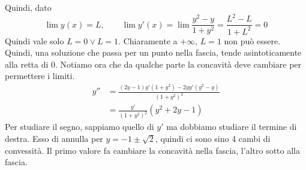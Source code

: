\documentclass[a4paper]{article}
\begin{document}
{    Quindi, dato
    \[
        \lim y(x) = L, \qquad \lim y'(x) = \lim \frac{y^2 - y}{1 + y^2} = \frac{L^2 - L}{1 + L^2} = 0
    \]
    Quindi vale solo \(L = 0 \lor L = 1\). Chiaramente a \(+\infty\), \(L=1\) non può essere.
    Quindi, una soluzione che passa per un punto nella fascia, tende asintoticamente alla retta di \(0\).
    Notiamo ora che da qualche parte la concavità deve cambiare per permettere i limiti.
    \begin{align*}
        y'' &= \frac{(2y - 1)y'(1 + y^2) - 2yy'(y^2-y)}{{(1 + y^2)}^2} \\
        &= \frac{y'}{{(1 + y^2)}^2} \left(y^2 + 2y - 1\right)
    \end{align*}
    Per studiare il segno, sappiamo quello di \(y'\) ma dobbiamo studiare il termine di destra. Esso di annulla per
    \(y = -1 \pm \sqrt{2}\), quindi ci sono sino 4 cambi di convessità. Il primo valore fa cambiare
    la concavità nella fascia, l'altro sotto alla fascia.
}
\end{document}
